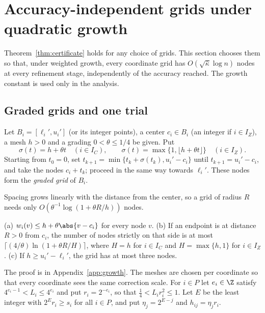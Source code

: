 \section{Accuracy-independent grids under quadratic growth}\label{sec:growth}

Theorem~\ref{thm:certificate} holds for any choice of grids. This section
chooses them so that, under weighted growth, every coordinate grid has
$O(\sqrt{\bar\kappa}\log n)$ nodes at every refinement stage, independently
of the accuracy reached. The growth constant is used only in the analysis.

\subsection{Graded grids and one trial}

\begin{definition}\label{def:graded}
Let $B_i=[\ell_i',u_i']$ (or its integer points), a center $c_i\in B_i$ (an
integer if $i\in I_Z$), a mesh $h>0$ and a grading $0<\theta\le1/4$ be given.
Put
\begin{equation}\label{eq:step}
\sigma(t)=h+\theta t\quad(i\in I_C),\qquad
\sigma(t)=\max\{1,\lfloor h+\theta t\rfloor\}\quad(i\in I_Z).
\end{equation}
Starting from $t_0=0$, set $t_{k+1}=\min\{t_k+\sigma(t_k),u_i'-c_i\}$ until
$t_{k+1}=u_i'-c_i$, and take the nodes $c_i+t_k$; proceed in the same way
towards $\ell_i'$. These nodes form the \emph{graded grid} of $B_i$.
\end{definition}

Spacing grows linearly with the distance from the center, so a grid of radius
$R$ needs only $O(\theta^{-1}\log(1+\theta R/h))$ nodes.

\begin{lemma}\label{lem:graded}
(a) $w_i(v)\le h+\theta\abs{v-c_i}$ for every node $v$.
(b) If an endpoint is at distance $R>0$ from $c_i$, the number of nodes
strictly on that side is at most $\lceil(4/\theta)\ln(1+\theta R/H)\rceil$,
where $H=h$ for $i\in I_C$ and $H=\max\{h,1\}$ for $i\in I_Z$.
(c) If $h\ge u_i'-\ell_i'$, the grid has at most three nodes.
\end{lemma}

The proof is in Appendix~\ref{app:growth}. The meshes are chosen per
coordinate so that every coordinate sees the same correction scale. For
$i\in P$ let $e_i\in\Z$ satisfy $4^{e_i-1}<L_i\le4^{e_i}$ and put
$r_i=2^{-e_i}$, so that $\frac14<L_ir_i^2\le1$. Let $E$ be the least integer
with $2^Er_i\ge s_i$ for all $i\in P$, and put $\eta_j=2^{E-j}$ and
$h_{ij}=\eta_jr_i$.

